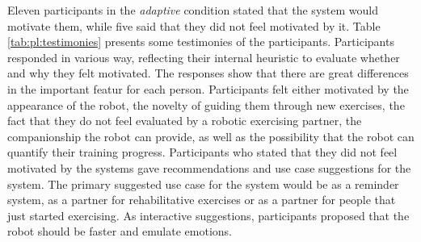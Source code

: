 \documentclass[twocolumn]{svjour3}          %
\begin{document}
Eleven participants in the \textit{adaptive} condition stated that the system would motivate them, while five said that they did not feel motivated by it. 
Table \ref{tab:pl:testimonies} presents some testimonies of the participants. Participants responded in various way, reflecting their internal heuristic to evaluate whether and why they felt motivated. The responses show that there are great differences in the important featur for each person. Participants felt either motivated by the appearance of the robot, the novelty of guiding them through new exercises, the fact that they do not feel evaluated by a robotic exercising partner, the companionship the robot can provide, as well as the possibility that the robot can quantify their training progress. Participants who stated that they did not feel motivated by the systems gave recommendations and use case suggestions for the system. The primary suggested use case for the system would be as a reminder system, as a partner for rehabilitative exercises or as a partner for people that just started exercising. As interactive suggestions, participants proposed that the robot should be faster and emulate emotions.   
\end{document}

